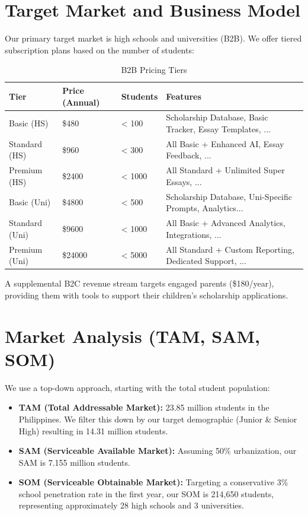 \documentclass{article}
\begin{document}
\section{Target Market and Business Model}

Our primary target market is high schools and universities (B2B).  We offer tiered subscription plans based on the number of students:

\begin{table}[h]
\centering
\begin{tabular}{@{}llll@{}}
\toprule
Tier & Price (Annual) & Students & Features \\ \midrule
Basic (HS) & \$480 & < 100 & Scholarship Database, Basic Tracker, Essay Templates, ... \\
Standard (HS) & \$960 & < 300 & All Basic + Enhanced AI, Essay Feedback, ... \\
Premium (HS) & \$2400 & < 1000 & All Standard + Unlimited Super Essays, ... \\
Basic (Uni) & \$4800 & < 500 & Scholarship Database, Uni-Specific Prompts, Analytics... \\
Standard (Uni) & \$9600 & < 1000 & All Basic + Advanced Analytics, Integrations, ... \\
Premium (Uni) & \$24000 & < 5000 & All Standard + Custom Reporting, Dedicated Support, ... \\ \bottomrule
\end{tabular}
\caption{B2B Pricing Tiers}
\end{table}

A supplemental B2C revenue stream targets engaged parents (\$180/year), providing them with tools to support their children's scholarship applications.

\section{Market Analysis (TAM, SAM, SOM)}

We use a top-down approach, starting with the total student population:

\begin{itemize}
    \item \textbf{TAM (Total Addressable Market):}  23.85 million students in the Philippines.  We filter this down by our target demographic (Junior & Senior High) resulting in 14.31 million students.
    \item \textbf{SAM (Serviceable Available Market):}  Assuming 50\% urbanization, our SAM is 7.155 million students.
    \item \textbf{SOM (Serviceable Obtainable Market):}  Targeting a conservative 3\% school penetration rate in the first year, our SOM is 214,650 students, representing approximately 28 high schools and 3 universities.
\end{itemize}
\end{document}
